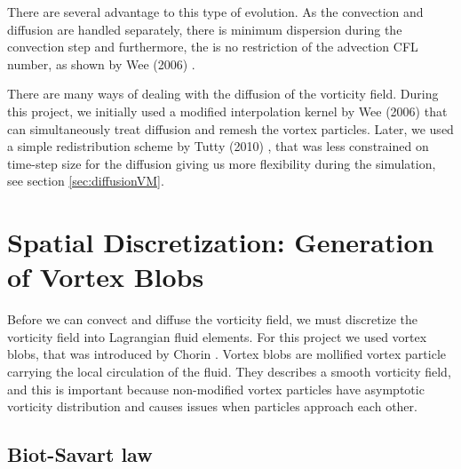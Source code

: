 There are several advantage to this type of evolution. As the convection and diffusion are handled separately, there is minimum dispersion during the convection step and furthermore, the is no restriction of the advection CFL number, as shown by Wee (2006) \cite{Wee2006a}.

There are many ways of dealing with the diffusion of the vorticity field. During this project, we initially used a modified interpolation kernel by Wee (2006) \cite{Wee2006a} that can simultaneously treat diffusion and remesh the vortex particles. Later, we used a simple redistribution scheme by Tutty (2010) \cite{Tutty2010a}, that was less constrained on time-step size for the diffusion giving us more flexibility during the simulation, see section \ref{sec:diffusionVM}.

\section{Spatial Discretization: Generation of Vortex Blobs}
\label{sec:spatialDiscretization}

Before we can convect and diffuse the vorticity field, we must discretize the vorticity field into Lagrangian fluid elements. For this project we used vortex blobs, that was introduced by Chorin \cite{Cottet2000a}. Vortex blobs are mollified vortex particle carrying the local circulation of the fluid. They describes a smooth vorticity field, and this is important because non-modified vortex particles have asymptotic vorticity distribution and causes issues when particles approach each other.

\subsection{Biot-Savart law}

